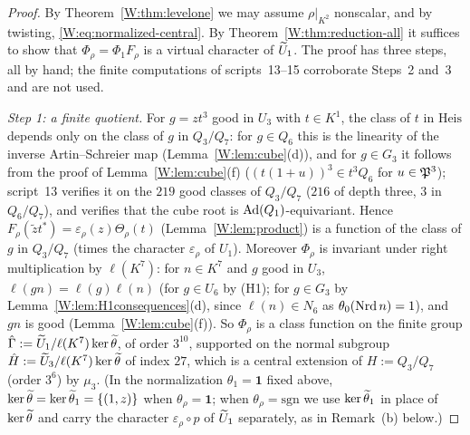 \begin{proof}
By Theorem~\ref{W:thm:levelone} we may assume $\rho|_{K^2}$ nonscalar, and
by twisting, \eqref{W:eq:normalized-central}.  By
Theorem~\ref{W:thm:reduction-all} it suffices to show that
$\Phi_\rho=\Phi_1F_\rho$ is a virtual character of $\widetilde U_1$.  The proof
has three steps, all by hand; the finite computations of
scripts~13--15 corroborate Steps~2 and~3 and are not used.

\emph{Step 1: a finite quotient.}  For $g=zt^3$ good in $U_3$ with
$t\in K^1$, the class of $t$ in $\mathrm{Heis}$ depends only on the
class of $g$ in $Q_3/Q_7$: for $g\in Q_6$ this is the linearity of the
inverse Artin--Schreier map (Lemma~\ref{W:lem:cube}(d)), and for
$g\in G_3$ it follows from the proof of Lemma~\ref{W:lem:cube}(f)
($(t(1+u))^3\in t^3Q_6$ for $u\in\mathfrak P^3$); script~13 verifies it on
the $219$ good classes of $Q_3/Q_7$ ($216$ of depth three, $3$ in
$Q_6/Q_7$), and verifies that the cube root is $\operatorname{Ad}(Q_1)$-equivariant.
Hence $F_\rho(\tilde zt^*)=\varepsilon_\rho(z)\Theta_\rho(t)$
(Lemma~\ref{W:lem:product}) is a function of the class of $g$ in
$Q_3/Q_7$ (times the character $\varepsilon_\rho$ of $U_1$).  Moreover
$\Phi_\rho$ is invariant under right multiplication by $\ell(K^7)$: for
$n\in K^7$ and $g$ good in $U_3$, $\ell(gn)=\ell(g)\ell(n)$ (for
$g\in U_6$ by (H1); for $g\in G_3$ by Lemma~\ref{W:lem:H1consequences}(d),
since $\ell(n)\in N_6$ as $\theta_0(\operatorname{Nrd} n)=1$), and $gn$ is good
(Lemma~\ref{W:lem:cube}(f)).  So $\Phi_\rho$ is a class function on the
finite group $\hat\Gamma:=\widetilde U_1/\ell(K^7)\ker\widetilde\theta$, of order $3^{10}$,
supported on the normal subgroup $\hat H:=\widetilde U_3/\ell(K^7)\ker\widetilde\theta$ of
index $27$, which is a central extension of $H:=Q_3/Q_7$ (order $3^6$)
by $\mu_3$.  (In the normalization $\theta_1=\mathbf1$ fixed above,
$\ker\widetilde\theta=\ker\widetilde\theta_1=\{(1,z)\}$ when $\theta_\rho=\mathbf1$; when
$\theta_\rho=\mathrm{sgn}$ we use $\ker\widetilde\theta_1$ in place of $\ker\widetilde\theta$ and
carry the character $\varepsilon_\rho\circ p$ of $\widetilde U_1$ separately, as
in Remark~(b) below.)


\end{proof}
